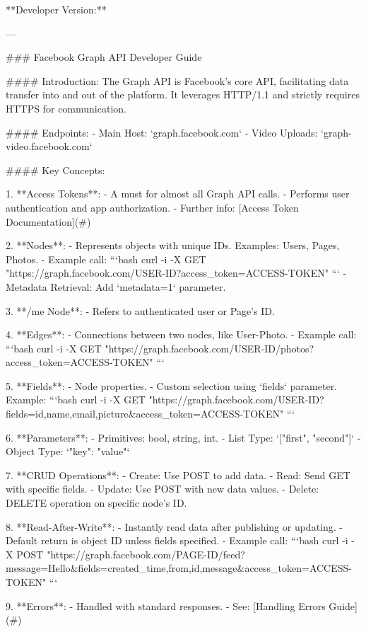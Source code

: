 **Developer Version:**

---

### Facebook Graph API Developer Guide

#### Introduction:
The Graph API is Facebook's core API, facilitating data transfer into and out of the platform. It leverages HTTP/1.1 and strictly requires HTTPS for communication.

#### Endpoints:
- Main Host: `graph.facebook.com`
- Video Uploads: `graph-video.facebook.com`

#### Key Concepts:

1. **Access Tokens**: 
   - A must for almost all Graph API calls.
   - Performs user authentication and app authorization.
   - Further info: [Access Token Documentation](#)

2. **Nodes**: 
   - Represents objects with unique IDs. Examples: Users, Pages, Photos.
   - Example call: 
     ```bash
     curl -i -X GET "https://graph.facebook.com/USER-ID?access_token=ACCESS-TOKEN"
     ```
   - Metadata Retrieval: Add `metadata=1` parameter.
   
3. **/me Node**: 
   - Refers to authenticated user or Page's ID.
   
4. **Edges**: 
   - Connections between two nodes, like User-Photo.
   - Example call: 
     ```bash
     curl -i -X GET "https://graph.facebook.com/USER-ID/photos?access_token=ACCESS-TOKEN"
     ```

5. **Fields**: 
   - Node properties.
   - Custom selection using `fields` parameter. Example:
     ```bash
     curl -i -X GET "https://graph.facebook.com/USER-ID?fields=id,name,email,picture&access_token=ACCESS-TOKEN"
     ```

6. **Parameters**:
   - Primitives: bool, string, int.
   - List Type: `["first", "second"]`
   - Object Type: `{"key": "value"}`

7. **CRUD Operations**:
   - Create: Use POST to add data.
   - Read: Send GET with specific fields.
   - Update: Use POST with new data values.
   - Delete: DELETE operation on specific node's ID.
   
8. **Read-After-Write**: 
   - Instantly read data after publishing or updating.
   - Default return is object ID unless fields specified.
   - Example call: 
     ```bash
     curl -i - X POST "https://graph.facebook.com/PAGE-ID/feed?message=Hello&fields=created_time,from,id,message&access_token=ACCESS-TOKEN"
     ```

9. **Errors**: 
   - Handled with standard responses.
   - See: [Handling Errors Guide](#)

